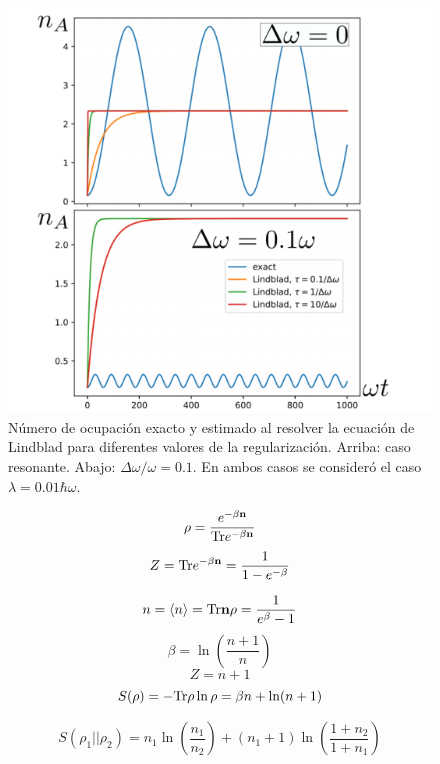 \documentclass{report} %
\numberwithin{equation}{section}
\begin{document}
\begin{figure}
  \centering
  \includegraphics[scale = 0.65]{figs/model3.1.3_lindblad-vs-exact.png}
  \caption{Número de ocupación exacto y estimado al resolver la ecuación de Lindblad para diferentes valores de la regularización. Arriba: caso resonante. Abajo: $\Delta \omega/\omega=0.1$. En ambos casos se consider\'o el caso $\lambda=0.01 \hbar \omega$.}
  \label{fig:model3.1.3_lindblad-vs-exact}
\end{figure}

\begin{Omitir}

\begin{equation}
\rho=\frac{e^{-\beta {\bf n}}}{{\Tr}e^{-\beta {\bf n}}}
\end{equation}
$$
Z={\Tr}{e^{-\beta {\bf n}}} = \frac{1}{1-e^{-\beta}}
$$

$$
n= \langle n\rangle ={\Tr}{\bf n}\rho = \frac{1}{e^{\beta}-1}
$$
$$
\beta=\ln(\frac{n+1}{n})
$$
$$
Z=n+1
$$
$$
S(\rho)=-{\Tr}\rho \ln \rho = \beta n +\ln(n+1)
$$

$$
S(\rho_1||\rho_2)=n_1 \ln(\frac{n_1}{n_2})+ (n_1+1)\ln(\frac{1+n_2}{1+n_1})
$$
\end{Omitir}
\end{document}
